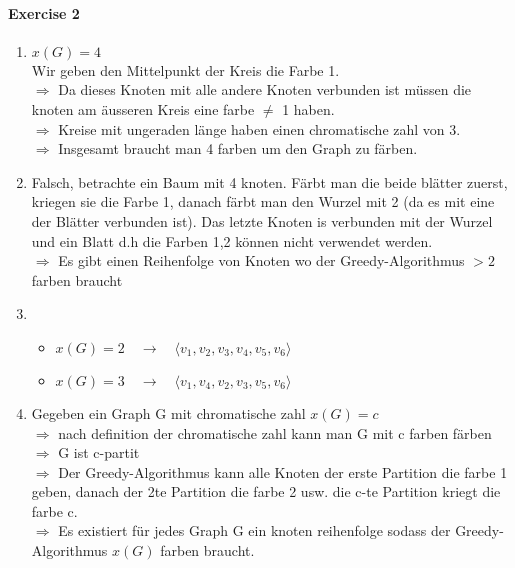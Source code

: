 \documentclass{report}
\begin{document}
\paragraph{Exercise 2}
\begin{enumerate}[label = \alph*)]
\item $\mathit{x}(G) =4$\\
Wir geben den Mittelpunkt der Kreis die Farbe 1.\\
$\Rightarrow$ Da dieses Knoten mit alle andere Knoten verbunden ist müssen die knoten am äusseren Kreis eine farbe $\neq$ 1 haben.\\
$\Rightarrow$ Kreise mit ungeraden länge haben einen chromatische zahl von 3.\\
$\Rightarrow$ Insgesamt braucht man 4 farben um den Graph zu färben.
\item Falsch, betrachte ein Baum mit 4 knoten. Färbt man die beide blätter zuerst, kriegen sie die Farbe 1, danach färbt man den Wurzel mit 2 (da es mit eine der Blätter verbunden ist). Das letzte Knoten is verbunden mit der Wurzel und ein Blatt d.h die Farben 1,2 können nicht verwendet werden.\\
$\Rightarrow$ Es gibt einen Reihenfolge von Knoten wo der Greedy-Algorithmus $>2$ farben braucht
\item
\begin{itemize}
\item $\mathit{x}(G) = 2\quad \rightarrow \quad \langle v_1,v_2,v_3,v_4,v_5,v_6 \rangle$
\item $\mathit{x}(G) = 3\quad \rightarrow \quad \langle v_1,v_4,v_2,v_3,v_5,v_6 \rangle$
\end{itemize}
\item Gegeben ein Graph G mit chromatische zahl $\mathit{x}(G) = c $\\
$\Rightarrow$ nach definition der chromatische zahl kann man G mit c farben färben\\
$\Rightarrow$ G ist c-partit\\
$\Rightarrow$ Der Greedy-Algorithmus kann alle Knoten der erste Partition die farbe 1 geben, danach der 2te Partition die farbe 2 usw. die c-te Partition kriegt die farbe c.\\
$\Rightarrow$ Es existiert für jedes Graph G ein knoten reihenfolge sodass der Greedy-Algorithmus $\mathit{x}(G)$ farben braucht.\\
\end{enumerate}
\end{document}
